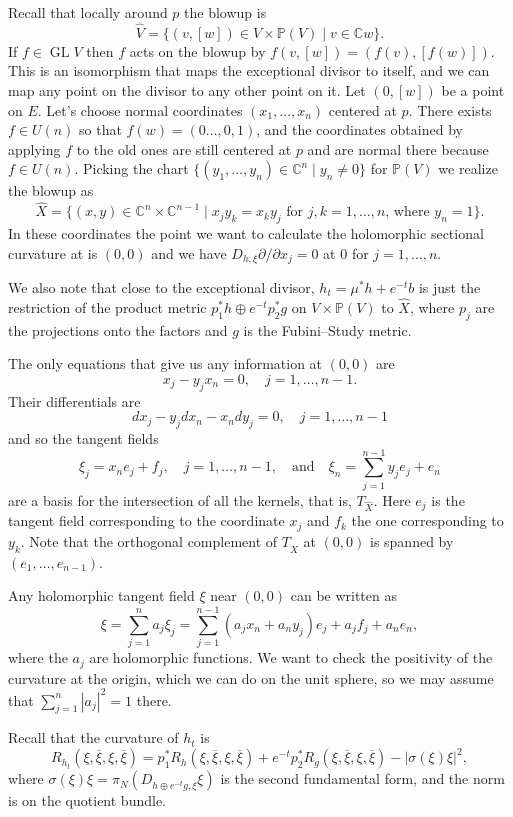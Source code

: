 \documentclass[10pt,a4paper]{amsart}
\newcommand{\kk}[1]{\mathbb{#1}}
\def\qandq{\quad\text{and}\quad}
\def\ov#1{\overline{#1}}
\DeclareMathOperator{\GL}{GL}
\def\hsc{holomorphic sectional curvature}
\def\bl#1{\widehat{#1}}
\def\blX{\bl{X}}
\begin{document}
Recall that locally around $p$ the blowup is
$$
\bl V
= \{ (v,[w]) \in V \times \kk P(V) \mid v \in \kk C w \}.
$$
If $f \in \GL V$ then $f$ acts on the blowup by $f(v, [w]) = (f(v), [f(w)])$.
This is an isomorphism that maps the exceptional divisor to itself, and we can
map any point on the divisor to any other point on it.
Let $(0, [w])$ be a point on $E$.
Let's choose normal coordinates $(x_1,\ldots,x_n)$ centered at $p$.
There exists $f \in U(n)$ so that $f(w) = (0 \ldots, 0, 1)$, and the
coordinates obtained by applying $f$ to the old ones are still centered at $p$
and are normal there because $f \in U(n)$.
Picking the chart $\{(y_1, \ldots, y_n) \in \kk C^n \mid y_n \not= 0 \}$ for
$\kk P(V)$
we realize the blowup as
$$
\bl X
= \{ (x,y) \in \kk C^n \times \kk C^{n-1}
\mid x_j y_k = x_k y_j \text{ for $j,k = 1,\ldots,n$, where $y_n = 1$}  \}.
$$
In these coordinates the point we want to calculate the \hsc{} at is $(0,0)$
and we have $D_{h,\xi} \partial / \partial x_j = 0$ at $0$ for $j = 1, \ldots, n$.

We also note that close to the exceptional divisor, $h_t = \mu^* h + e^{-t} b$ is
just the restriction of the product metric $p_1^* h \oplus e^{-t} p_2^* g$ on
$V \times \kk P(V)$ to $\bl X$, where $p_j$ are the projections onto the
factors and $g$ is the Fubini--Study metric.

The only equations that give us any information at $(0,0)$ are
$$
x_j - y_j x_n = 0, \quad j = 1, \ldots, n-1.
$$
Their differentials are
$$
dx_j - y_j dx_n - x_n dy_j = 0, \quad j=1,\ldots,n-1
$$
and so the tangent fields
$$
\xi_j = x_n e_j + f_j,
\quad j=1,\ldots,n-1,
\qandq
\xi_n = \sum_{j=1}^{n-1} y_j e_j + e_n
$$
are a basis for
the intersection of all the kernels, that is, $T_{\blX}$.
Here $e_j$ is the tangent field corresponding to the coordinate $x_j$
and $f_k$ the one corresponding to $y_k$.
Note that the orthogonal complement of $T_{\blX}$ at $(0,0)$ is spanned by
$(e_1, \ldots, e_{n-1})$.

Any holomorphic tangent field $\xi$ near $(0,0)$ can be written as
$$
\xi = \sum_{j=1}^n a_j \xi_j
= \sum_{j=1}^{n-1} (a_j x_n + a_n y_j) e_j + a_j f_j
+ a_n e_n,
$$
where the $a_j$ are holomorphic functions.
We want to check the positivity of the curvature at the origin, which we can do
on the unit sphere, so we may assume that $\sum_{j=1}^n |a_j|^2 = 1$ there.

Recall that the curvature of $h_t$ is
$$
R_{h_t}(\xi, \ov\xi, \xi, \ov\xi)
= p_1^* R_h(\xi, \ov\xi, \xi, \ov\xi)
+ e^{-t} p_2^* R_g(\xi, \ov\xi, \xi, \ov\xi)
- |\sigma(\xi)\xi|^2,
$$
where $\sigma(\xi)\xi = \pi_N(D_{h \oplus e^{-t} g,\xi} \xi)$ is the second
fundamental form, and the norm is on the quotient bundle.
\end{document}
